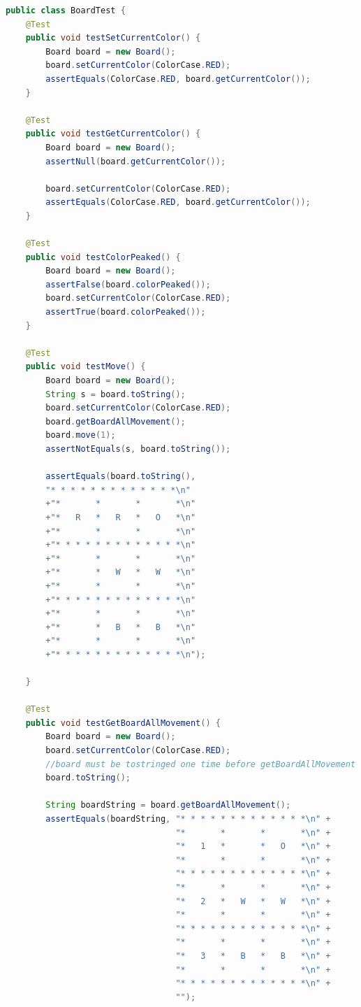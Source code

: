\documentclass[a4paper,11pt]{article}
\begin{document}
\begin{lstlisting}[language=Java]
public class BoardTest {
    @Test
    public void testSetCurrentColor() {
        Board board = new Board();
        board.setCurrentColor(ColorCase.RED);
        assertEquals(ColorCase.RED, board.getCurrentColor());
    }

    @Test
    public void testGetCurrentColor() {
        Board board = new Board();
        assertNull(board.getCurrentColor());

        board.setCurrentColor(ColorCase.RED);
        assertEquals(ColorCase.RED, board.getCurrentColor());
    }

    @Test
    public void testColorPeaked() {
        Board board = new Board();
        assertFalse(board.colorPeaked());
        board.setCurrentColor(ColorCase.RED);
        assertTrue(board.colorPeaked());
    }

    @Test
    public void testMove() {
        Board board = new Board();
        String s = board.toString();
        board.setCurrentColor(ColorCase.RED);
        board.getBoardAllMovement();
        board.move(1);
        assertNotEquals(s, board.toString());

        assertEquals(board.toString(), 
        "* * * * * * * * * * * * *\n"
        +"*       *       *       *\n"
        +"*   R   *   R   *   O   *\n"
        +"*       *       *       *\n"
        +"* * * * * * * * * * * * *\n"
        +"*       *       *       *\n"
        +"*       *   W   *   W   *\n"
        +"*       *       *       *\n"
        +"* * * * * * * * * * * * *\n"
        +"*       *       *       *\n"
        +"*       *   B   *   B   *\n"
        +"*       *       *       *\n"
        +"* * * * * * * * * * * * *\n");
        
    }

    @Test
    public void testGetBoardAllMovement() {
        Board board = new Board();
        board.setCurrentColor(ColorCase.RED);
        //board must be tostringed one time before getBoardAllMovement
        board.toString();
        
        String boardString = board.getBoardAllMovement();
        assertEquals(boardString, "* * * * * * * * * * * * *\n" + 
                                  "*       *       *       *\n" + 
                                  "*   1   *       *   O   *\n" + 
                                  "*       *       *       *\n" + 
                                  "* * * * * * * * * * * * *\n" + 
                                  "*       *       *       *\n" + 
                                  "*   2   *   W   *   W   *\n" + 
                                  "*       *       *       *\n" + 
                                  "* * * * * * * * * * * * *\n" + 
                                  "*       *       *       *\n" + 
                                  "*   3   *   B   *   B   *\n" + 
                                  "*       *       *       *\n" + 
                                  "* * * * * * * * * * * * *\n" + 
                                  "");


\end{lstlisting}
\end{document}
